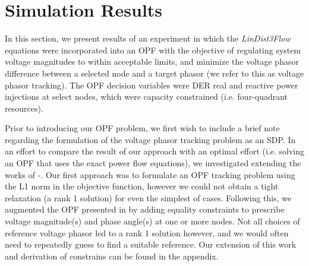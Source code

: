 \section{Simulation Results}
\label{sec:simulation_results}

In this section, we present results of an experiment in which the \emph{LinDist3Flow} equations were incorporated into an OPF with the objective of regulating system voltage magnitudes to within acceptable limits, and minimize the voltage phasor difference between a selected node and a target phasor (we refer to this as voltage phasor tracking). The OPF decision variables were DER real and reactive power injections at select nodes, which were capacity constrained (i.e. four-quadrant resources).

Prior to introducing our OPF problem, we first wish to include a brief note regarding the formulation of the voltage phasor tracking problem as an SDP.  In an effort to compare the result of our approach with an optimal effort (i.e. solving an OPF that uses the exact power flow equations), we investigated extending the works of \cite{dall2012optimization}-\cite{dall2013distributed}. Our first approach was to formulate an OPF tracking problem using the L1 norm in the objective function, however we could not obtain a tight relaxation (a rank 1 solution) for even the simplest of cases. Following this, we augmented the OPF presented in \cite{dall2013distributed} by adding equality constraints to prescribe voltage magnitude(s) and phase angle(s) at one or more nodes. Not all choices of reference voltage phasor led to a rank 1 solution however, and we would often need to repeatedly guess to find a suitable reference. Our extension of this work and derivation of constrains can be found in the appendix.


